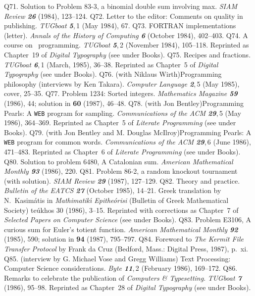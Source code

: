 \p Q71. Solution to Problem 83-3, a binomial double sum involving max.
 {\sl SIAM Review\/ \bf 26} (1984), 123--124.
\p Q72. Letter to the editor: Comments on quality in publishing.
 {\sl TUGboat\/ \bf 5},\,1 (May 1984), 67.
\p Q73. FORTRAN implementations (letter). {\sl Annals of the History of
 Computing\/ \bf 6} (October 1984), 402--403.
\p Q74. A course on \MF\ programming. {\sl TUGboat\/ \bf 5},\,2
 (November 1984), 105--118.
 Reprinted as Chapter~19 of {\sl Digital Typography\/} (see under Books).
\p Q75. Recipes and fractions. {\sl TUGboat\/ \bf 6},\,1 (March, 1985), 36--38.
 Reprinted as Chapter~5 of {\sl Digital Typography\/} (see under Books).
\p *Q76. (with Niklaus Wirth)\xskip Programming philosophy (interviews by Ken
 Takara). {\sl Computer Language\/ \bf 2},\,5 (May 1985), cover, 25--35.
\p Q77. Problem 1234: Sorted integers. {\sl Mathematics Magazine\/ \bf59}
 (1986), 44; solution in {\bf 60} (1987), 46--48.
\p *Q78. (with Jon Bentley)\xskip Programming Pearls:
 A {\tt WEB} program for sampling. {\sl Communications of the ACM\/ \bf 29},\,5
 (May 1986), 364--369. Reprinted as Chapter~5 of {\sl Literate Programming\/}
 (see under Books).
\p *Q79. (with Jon Bentley and M. Douglas McIlroy)\xskip Programming Pearls:
 A {\tt WEB} program for common words. {\sl Communications of the ACM\/
 \bf29},\,6 (June 1986), 471--483. Reprinted as Chapter~6 of
 {\sl Literate Programming\/} (see under Books).
\p Q80. Solution to problem 6480, A Catalonian sum.
 {\sl American Mathematical Monthly\/ \bf93} (1986), 220.
\p Q81. Problem 86-2, a random knockout tournament (with solution).
 {\sl SIAM Review \bf29} (1987), 127--129.
\p Q82. Theory and practice. {\sl Bulletin of the EATCS\/ \bf27}
 (October 1985), 14--21.
 Greek translation by N.~Kasi\-m\'atis in {\sl Mathimatik{\'\i}
 Epithe\'orisi\/}
 (Bulletin of Greek Mathematical Society) te\'ukhos 30 (1986), 3--15.
 Reprinted with corrections as Chapter~7 of {\sl Selected Papers on
 Computer Science\/} (see under Books).
\p Q83. Problem E3106, A curious sum for Euler's totient function.
 {\sl American Mathematical Monthly\/ \bf92} (1985), 590; solution in
 {\bf94} (1987), 795--797.
\p Q84. Foreword to {\sl The Kermit File Transfer Protocol\/} by
 Frank da Cruz (Bedford, Mass.: Digital Press, 1987), p.~xi.
\p *Q85. (interview by G. Michael Vose and Gregg Williams) Text
 Processing: Computer Science considerations. {\sl Byte\/ \bf 11},\,2
 (February 1986),  169--172.
\p Q86. Remarks to celebrate the publication of {\sl Computers \&
 Typesetting}. {\sl TUGboat\/ \bf7} (1986), 95--98.
 Re\-printed as Chapter~28 of {\sl Digital Typography\/} (see under Books).
